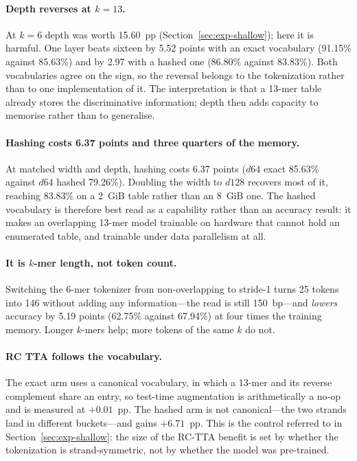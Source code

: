 \paragraph{Depth reverses at $k=13$.} At $k=6$ depth was worth 15.60~pp (Section~\ref{sec:exp-shallow}); here it is harmful. One layer beats sixteen by 5.52 points with an exact vocabulary (91.15\% against 85.63\%) and by 2.97 with a hashed one (86.80\% against 83.83\%). Both vocabularies agree on the sign, so the reversal belongs to the tokenization rather than to one implementation of it. The interpretation is that a 13-mer table already stores the discriminative information; depth then adds capacity to memorise rather than to generalise.

\paragraph{Hashing costs 6.37 points and three quarters of the memory.} At matched width and depth, hashing costs 6.37 points ($d64$ exact 85.63\% against $d64$ hashed 79.26\%). Doubling the width to $d128$ recovers most of it, reaching 83.83\% on a 2~GiB table rather than an 8~GiB one. The hashed vocabulary is therefore best read as a capability rather than an accuracy result: it makes an overlapping 13-mer model trainable on hardware that cannot hold an enumerated table, and trainable under data parallelism at all.

\paragraph{It is $k$-mer length, not token count.} Switching the 6-mer tokenizer from non-overlapping to stride-1 turns 25 tokens into 146 without adding any information---the read is still 150~bp---and \emph{lowers} accuracy by 5.19 points (62.75\% against 67.94\%) at four times the training memory. Longer $k$-mers help; more tokens of the same $k$ do not.

\paragraph{RC TTA follows the vocabulary.} The exact arm uses a canonical vocabulary, in which a 13-mer and its reverse complement share an entry, so test-time augmentation is arithmetically a no-op and is measured at $+0.01$~pp. The hashed arm is not canonical---the two strands land in different buckets---and gains $+6.71$~pp. This is the control referred to in Section~\ref{sec:exp-shallow}: the size of the RC-TTA benefit is set by whether the tokenization is strand-symmetric, not by whether the model was pre-trained.

